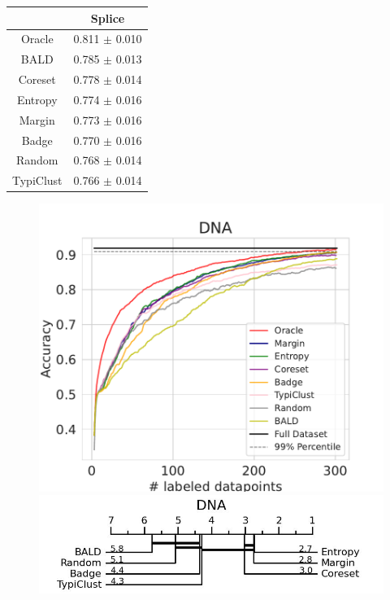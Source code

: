 \documentclass[]{article}
\begin{document}
\begin{minipage}{0.29\linewidth}
\begin{tabular}{c|c}
    &Splice \\
    \hline
    Oracle&0.811 $\pm$ 0.010\\
    BALD&0.785 $\pm$ 0.013\\
    Coreset&0.778 $\pm$ 0.014\\
    Entropy&0.774 $\pm$ 0.016\\
    Margin&0.773 $\pm$ 0.016\\
    Badge&0.770 $\pm$ 0.016\\
    Random&0.768 $\pm$ 0.014\\
    TypiClust&0.766 $\pm$ 0.014\\
\end{tabular}
\end{minipage}
\begin{minipage}{0.65\linewidth}
\begin{figure}[H]
    \centering
	\includegraphics[width=\linewidth]{img/eval_dna} \\ [2mm]
        \includegraphics[width=\linewidth]{img/micro_dna.jpg}
\end{figure}
\end{minipage}
\end{document}
